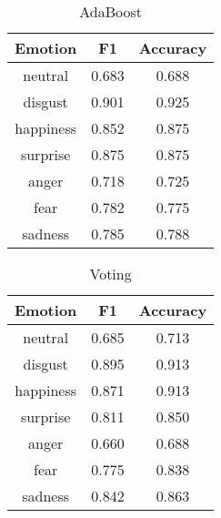 \begin{table}[h]
\caption{AdaBoost}
\label{table:adaboost}
\centering
    \begin{tabular}{|c|c|c|}
\hline
\textbf{Emotion} &  \textbf{F1} &  \textbf{Accuracy} \\ \hline \hline
neutral& 0.683& 0.688 \\ \hline
disgust& 0.901& 0.925 \\ \hline
happiness& 0.852& 0.875 \\ \hline
surprise& 0.875& 0.875 \\ \hline
anger& 0.718& 0.725 \\ \hline
fear& 0.782& 0.775 \\ \hline
sadness& 0.785& 0.788 \\ \hline
\end{tabular}
\end{table}
\begin{table}[h]
\caption{Voting}
\label{table:voting}
\centering
    \begin{tabular}{|c|c|c|}
\hline
\textbf{Emotion} &  \textbf{F1} &  \textbf{Accuracy} \\ \hline \hline
neutral& 0.685& 0.713 \\ \hline
disgust& 0.895& 0.913 \\ \hline
happiness& 0.871& 0.913 \\ \hline
surprise& 0.811& 0.850 \\ \hline
anger& 0.660& 0.688 \\ \hline
fear& 0.775& 0.838 \\ \hline
sadness& 0.842& 0.863 \\ \hline
\end{tabular}
\end{table}

